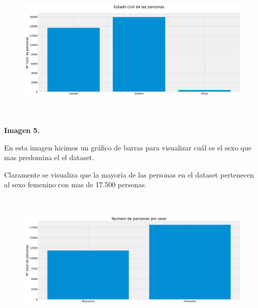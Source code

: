 \documentclass[12pt]{report}
\renewcommand{\_}{\kern-1.5pt\textunderscore\kern-1.5pt}
\begin{document}

\begin{figure}[H]
	\begin{Center}
		\includegraphics[width=6.27in,height=2.67in]{./media/image8.png}
	\end{Center}
\end{figure}




\vspace{\baselineskip}
\vspace{\baselineskip}
\begin{justify}
\textbf{Imagen 5.}
\end{justify}
\begin{justify}
En esta imagen hicimos un gráfico de barras para visualizar cuál es el sexo que mas predomina el el dataset.
\end{justify}
\begin{justify}
Claramente se visualiza que la mayoría de las personas en el dataset pertenecen al sexo femenino con mas de 17.500 personas.
\end{justify}



\begin{figure}[H]
	\begin{Center}
		\includegraphics[width=6.27in,height=2.56in]{./media/image2.png}
	\end{Center}
\end{figure}
\end{document}
